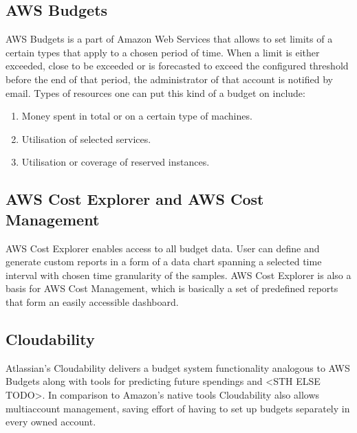 \documentclass[licencjacka,en]{thesisclass}
\begin{document}
        \subsection{AWS Budgets}

        AWS Budgets is a part of Amazon Web Services that allows to set limits of a certain types
        that apply to a chosen period of time. When a limit is either exceeded,
        close to be exceeded or is forecasted to exceed the configured threshold before the end of that period,
        the administrator of that account is notified by email. Types of resources one can put this kind of a budget on include:
        
        \begin{enumerate}
            \item Money spent in total or on a certain type of machines.
            \item Utilisation of selected services.
            \item Utilisation or coverage of reserved instances.
        \end{enumerate}
	\begin{flushright}
		\cite{AWSDocs}
	\end{flushright}

        \subsection{AWS Cost Explorer and AWS Cost Management}

	AWS Cost Explorer enables access to all budget data. User can define and generate custom reports in a form of a data chart spanning a selected time interval with chosen time granularity of the samples.
	AWS Cost Explorer is also a basis for AWS Cost Management, which is basically a set of predefined reports that form an easily accessible dashboard.

	\subsection{Cloudability}

	Atlassian's Cloudability delivers a budget system functionality analogous to AWS Budgets
	along with tools for predicting future spendings and <STH ELSE TODO>. In comparison to Amazon's
	native tools Cloudability also allows multiaccount management, saving effort of having to set up budgets separately in every owned account.
\end{document}
